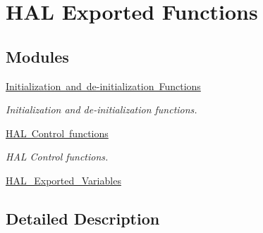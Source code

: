 \hypertarget{group___h_a_l___exported___functions}{}\section{H\+AL Exported Functions}
\label{group___h_a_l___exported___functions}
\subsection*{Modules}
\begin{DoxyCompactItemize}
\item 
\mbox{\hyperlink{group___h_a_l___exported___functions___group1}{Initialization and de-\/initialization Functions}}
\begin{DoxyCompactList}\small\item\em Initialization and de-\/initialization functions. \end{DoxyCompactList}\item 
\mbox{\hyperlink{group___h_a_l___exported___functions___group2}{H\+A\+L Control functions}}
\begin{DoxyCompactList}\small\item\em H\+AL Control functions. \end{DoxyCompactList}\item 
\mbox{\hyperlink{group___h_a_l___exported___variables}{H\+A\+L\+\_\+\+Exported\+\_\+\+Variables}}
\end{DoxyCompactItemize}


\subsection{Detailed Description}
